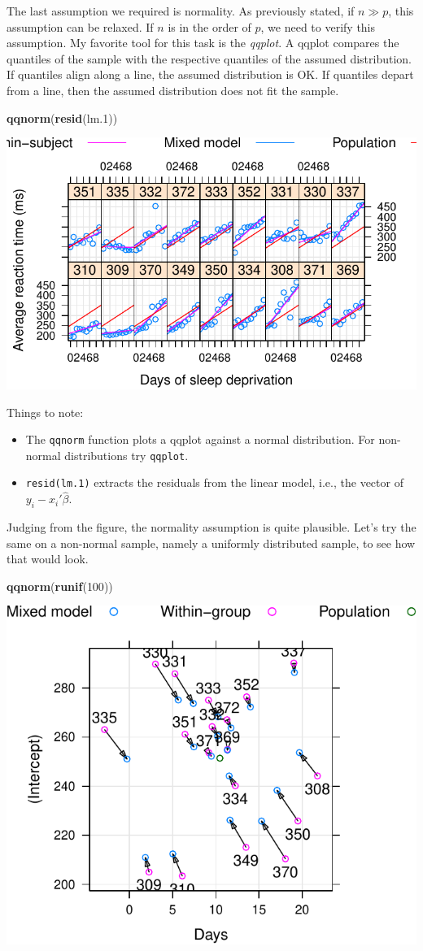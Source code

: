 \documentclass[]{book}
\newenvironment{Shaded}{\begin{snugshade}}{\end{snugshade}}
\newcommand{\KeywordTok}[1]{\textcolor[rgb]{0.13,0.29,0.53}{\textbf{#1}}}
\newcommand{\DecValTok}[1]{\textcolor[rgb]{0.00,0.00,0.81}{#1}}
\newcommand{\NormalTok}[1]{#1}
\providecommand{\tightlist}{%
  \setlength{\itemsep}{0pt}\setlength{\parskip}{0pt}}
\theoremstyle{definition}
\theoremstyle{definition}
\theoremstyle{definition}
\theoremstyle{remark}
\begin{document}
The last assumption we required is normality. As previously stated, if
\(n \gg p\), this assumption can be relaxed. If \(n\) is in the order of
\(p\), we need to verify this assumption. My favorite tool for this task
is the \emph{qqplot}. A qqplot compares the quantiles of the sample with
the respective quantiles of the assumed distribution. If quantiles align
along a line, the assumed distribution is OK. If quantiles depart from a
line, then the assumed distribution does not fit the sample.

\begin{Shaded}
\begin{Highlighting}[]
\KeywordTok{qqnorm}\NormalTok{(}\KeywordTok{resid}\NormalTok{(lm.}\DecValTok{1}\NormalTok{))}
\end{Highlighting}
\end{Shaded}

\includegraphics[width=0.5\linewidth]{Rcourse_files/figure-latex/unnamed-chunk-163-1}

Things to note:

\begin{itemize}
\tightlist
\item
  The \texttt{qqnorm} function plots a qqplot against a normal
  distribution. For non-normal distributions try \texttt{qqplot}.
\item
  \texttt{resid(lm.1)} extracts the residuals from the linear model,
  i.e., the vector of \(y_i-x_i'\hat \beta\).
\end{itemize}

Judging from the figure, the normality assumption is quite plausible.
Let's try the same on a non-normal sample, namely a uniformly
distributed sample, to see how that would look.

\begin{Shaded}
\begin{Highlighting}[]
\KeywordTok{qqnorm}\NormalTok{(}\KeywordTok{runif}\NormalTok{(}\DecValTok{100}\NormalTok{))}
\end{Highlighting}
\end{Shaded}

\includegraphics[width=0.5\linewidth]{Rcourse_files/figure-latex/unnamed-chunk-164-1}
\end{document}
